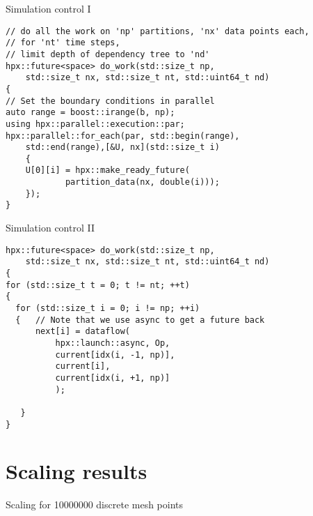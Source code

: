 \documentclass[\classoption]{beamer}
\begin{document}
\begin{frame}[fragile]{Simulation control I}

\begin{lstlisting}
// do all the work on 'np' partitions, 'nx' data points each, 
// for 'nt' time steps, 
// limit depth of dependency tree to 'nd'
hpx::future<space> do_work(std::size_t np, 
    std::size_t nx, std::size_t nt, std::uint64_t nd)
{
// Set the boundary conditions in parallel
auto range = boost::irange(b, np);
using hpx::parallel::execution::par;
hpx::parallel::for_each(par, std::begin(range), 
    std::end(range),[&U, nx](std::size_t i)
    {
    U[0][i] = hpx::make_ready_future(
    	    partition_data(nx, double(i)));
    });  
}
\end{lstlisting}

\end{frame}

\begin{frame}[fragile]{Simulation control II}

\begin{lstlisting}
hpx::future<space> do_work(std::size_t np, 
    std::size_t nx, std::size_t nt, std::uint64_t nd)
{
for (std::size_t t = 0; t != nt; ++t)
{
  for (std::size_t i = 0; i != np; ++i)
  {   // Note that we use async to get a future back
      next[i] = dataflow(
          hpx::launch::async, Op,
          current[idx(i, -1, np)], 
          current[i], 
          current[idx(i, +1, np)]
          );

   }
}
\end{lstlisting}

\end{frame}


\section{Scaling results}


\begin{frame}{Scaling for 10000000 discrete mesh points}

\begin{center}
\end{center}
\end{frame}
\end{document}

